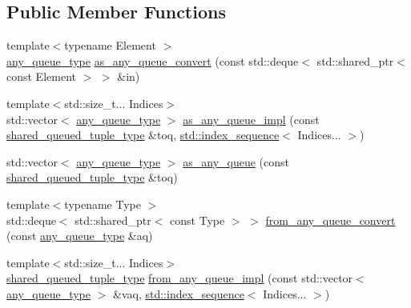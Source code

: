 \subsection*{Public Member Functions}
\begin{DoxyCompactItemize}
\item 
{\footnotesize template$<$typename Element $>$ }\\\hyperlink{struct_wire_cell_1_1shared__queued_3_01_t_3_01_types_8_8_8_01_4_01_4_a8ff8e1f0ff23fd750a91eeb2d4952bb0}{any\+\_\+queue\+\_\+type} \hyperlink{struct_wire_cell_1_1shared__queued_3_01_t_3_01_types_8_8_8_01_4_01_4_a7e41a94985bfcf931dcbe6068a47f59e}{as\+\_\+any\+\_\+queue\+\_\+convert} (const std\+::deque$<$ std\+::shared\+\_\+ptr$<$ const Element $>$ $>$ \&in)
\item 
{\footnotesize template$<$std\+::size\+\_\+t... Indices$>$ }\\std\+::vector$<$ \hyperlink{struct_wire_cell_1_1shared__queued_3_01_t_3_01_types_8_8_8_01_4_01_4_a8ff8e1f0ff23fd750a91eeb2d4952bb0}{any\+\_\+queue\+\_\+type} $>$ \hyperlink{struct_wire_cell_1_1shared__queued_3_01_t_3_01_types_8_8_8_01_4_01_4_ab40492fc67fd4361340d9d3f2cff79ce}{as\+\_\+any\+\_\+queue\+\_\+impl} (const \hyperlink{struct_wire_cell_1_1shared__queued_3_01_t_3_01_types_8_8_8_01_4_01_4_ab8420ec9cbc02f0d73f0e7521a063cb0}{shared\+\_\+queued\+\_\+tuple\+\_\+type} \&toq, \hyperlink{structstd_1_1index__sequence}{std\+::index\+\_\+sequence}$<$ Indices... $>$)
\item 
std\+::vector$<$ \hyperlink{struct_wire_cell_1_1shared__queued_3_01_t_3_01_types_8_8_8_01_4_01_4_a8ff8e1f0ff23fd750a91eeb2d4952bb0}{any\+\_\+queue\+\_\+type} $>$ \hyperlink{struct_wire_cell_1_1shared__queued_3_01_t_3_01_types_8_8_8_01_4_01_4_aff51f08da8659b24a7976cf41208188b}{as\+\_\+any\+\_\+queue} (const \hyperlink{struct_wire_cell_1_1shared__queued_3_01_t_3_01_types_8_8_8_01_4_01_4_ab8420ec9cbc02f0d73f0e7521a063cb0}{shared\+\_\+queued\+\_\+tuple\+\_\+type} \&toq)
\item 
{\footnotesize template$<$typename Type $>$ }\\std\+::deque$<$ std\+::shared\+\_\+ptr$<$ const Type $>$ $>$ \hyperlink{struct_wire_cell_1_1shared__queued_3_01_t_3_01_types_8_8_8_01_4_01_4_a1c5cc010c23aafb78d2acc2986455e9b}{from\+\_\+any\+\_\+queue\+\_\+convert} (const \hyperlink{struct_wire_cell_1_1shared__queued_3_01_t_3_01_types_8_8_8_01_4_01_4_a8ff8e1f0ff23fd750a91eeb2d4952bb0}{any\+\_\+queue\+\_\+type} \&aq)
\item 
{\footnotesize template$<$std\+::size\+\_\+t... Indices$>$ }\\\hyperlink{struct_wire_cell_1_1shared__queued_3_01_t_3_01_types_8_8_8_01_4_01_4_ab8420ec9cbc02f0d73f0e7521a063cb0}{shared\+\_\+queued\+\_\+tuple\+\_\+type} \hyperlink{struct_wire_cell_1_1shared__queued_3_01_t_3_01_types_8_8_8_01_4_01_4_a05f808da0c56b9db19c890882ac71fc6}{from\+\_\+any\+\_\+queue\+\_\+impl} (const std\+::vector$<$ \hyperlink{struct_wire_cell_1_1shared__queued_3_01_t_3_01_types_8_8_8_01_4_01_4_a8ff8e1f0ff23fd750a91eeb2d4952bb0}{any\+\_\+queue\+\_\+type} $>$ \&vaq, \hyperlink{structstd_1_1index__sequence}{std\+::index\+\_\+sequence}$<$ Indices... $>$)

\end{DoxyCompactItemize}
